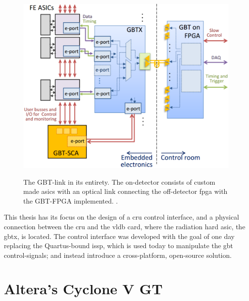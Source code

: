 \documentclass[main.tex]{subfiles}
\begin{document}
\begin{figure} %
\includegraphics[width=\linewidth]{../img/gbtsys}  \\[0.1 cm]
\caption{The GBT-link in its entirety. The on-detector consists of custom made \glspl{asic} with an optical link connecting the off-detector \gls{fpga} with the GBT-FPGA implemented. \cite[Figure 1]{gbtscapres}.}
\label{fig:hsmc}
\end{figure}

This thesis has its focus on the design of a \gls{cru} control interface, and a physical connection between the \gls{cru} and the \gls{vldb} card, where the radiation hard \gls{asic}, the \gls{gbt}x, is located. The control interface was developed with the goal of one day replacing the Quartus-bound \gls{issp}, which is used today to manipulate the \gls{gbt} control-signals; and instead introduce a cross-platform, open-source solution.


\section{Altera's Cyclone V GT} \label{sec:cyclone}
\end{document}

